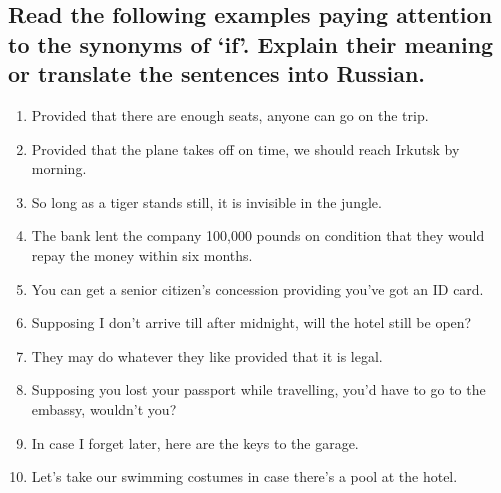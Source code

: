 \subsection*{Read the following examples paying attention to the synonyms of ‘if’. Explain their meaning or translate the sentences into Russian.}
\begin{enumerate}
      \item Provided that there are enough seats, anyone can go on the trip.
      \item Provided that the plane takes off on time, we should reach Irkutsk by morning.
      \item So long as a tiger stands still, it is invisible in the jungle.
      \item The bank lent the company 100,000 pounds on condition that they would repay the money within six months.
      \item You can get a senior citizen’s concession providing you’ve got an ID card.
      \item Supposing I don’t arrive till after midnight, will the hotel still be open?
      \item They may do whatever they like provided that it is legal.
      \item Supposing you lost your passport while travelling, you’d have to go to the embassy, wouldn’t you?
      \item In case I forget later, here are the keys to the garage.
      \item Let’s take our swimming costumes in case there’s a pool at the hotel.
\end{enumerate}

